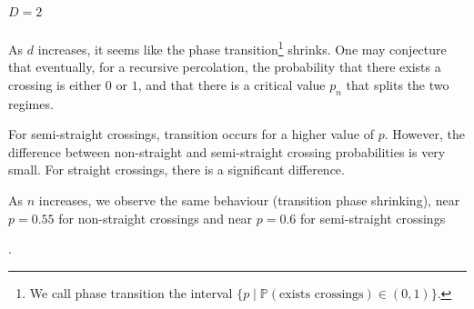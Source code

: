 \subparagraph{$D=2$}
As $d$ increases, it seems like the phase transition\footnote{We call phase transition the interval $\{ p \mid \mathbb{P}(\text{exists crossings}) \in (0,1) \}$.} shrinks.
One may conjecture that eventually, for a recursive percolation, the probability that there exists a crossing is either $0$ or $1$, and that there is a critical value $p_n$ that splits the two regimes.

For semi-straight crossings, transition occurs for a higher value of $p$\footnotemark.
However, the difference between non-straight and semi-straight crossing probabilities is very small.
For straight crossings, there is a significant difference.

As $n$ increases, we observe the same behaviour (transition phase shrinking), near $p=0.55$ for non-straight crossings and near $p=0.6$ for semi-straight crossings\addtocounter{footnote}{-1}\footnotemark.

